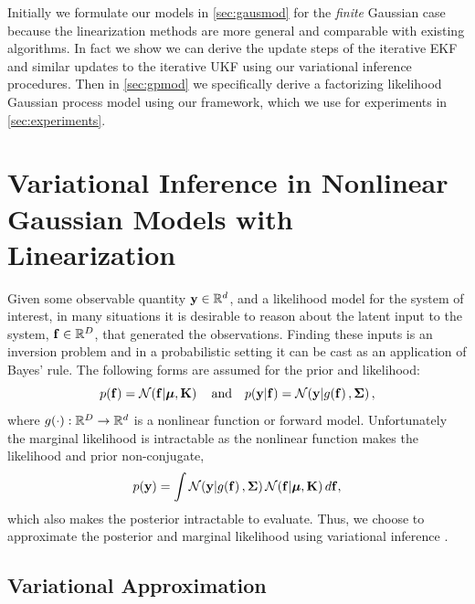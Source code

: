 \documentclass{article} %
\begin{document}
Initially we formulate our models in \autoref{sec:gausmod} for the
\emph{finite} Gaussian case because the linearization methods are more general
and comparable with existing algorithms. In fact we show we can derive the
update steps of the iterative EKF \cite{Bell1993} and similar updates to the
iterative UKF \cite{Sibley2006} using our variational inference procedures.
Then in \autoref{sec:gpmod} we specifically derive a factorizing likelihood
Gaussian process model using our framework, which we use for experiments in
\autoref{sec:experiments}.


\section{Variational Inference in Nonlinear Gaussian Models with Linearization}
\label{sec:gausmod}

Given some observable quantity $\mathbf{y} \in \mathbb{R}^{d}$, and a likelihood model for
the system of interest, in many situations it is desirable to reason about the
latent input to the system, $\mathbf{f}\in\mathbb{R}^{D}$, that generated the
observations. Finding these inputs is an inversion problem and in a
probabilistic setting it can be cast as an application of Bayes' rule.
The following forms are assumed for the prior and likelihood:
\begin{equation}
    p\!\left({\mathbf{f}}\right) = \mathcal{N}\!\left({\mathbf{f}}\middle\vert{\ensuremath{\boldsymbol{\mu}}, \ensuremath{\mathbf{K}}}\right)
    \quad \text{and} \quad
    p\!\left({\mathbf{y}}\middle\vert{\ensuremath{\mathbf{f}}}\right) = \mathcal{N}\!\left({\mathbf{y}}\middle\vert{\ensuremath{g\!\left({{\mathbf{f}}}\right)}, \ensuremath{\boldsymbol{\Sigma}}}\right),
    \label{eq:priorlike}
\end{equation}
where $g\!\left({{\cdot}}\right) : \mathbb{R}^{D} \to \mathbb{R}^{d}$ is a nonlinear function or
forward model. Unfortunately the marginal likelihood is intractable
as the nonlinear function makes the likelihood and prior non-conjugate,
\begin{equation}
    p\!\left({\mathbf{y}}\right) = \int \mathcal{N}\!\left({\mathbf{y}}\middle\vert{\ensuremath{g\!\left({{\mathbf{f}}}\right)}, \ensuremath{\boldsymbol{\Sigma}}}\right)
        \mathcal{N}\!\left({\mathbf{f}}\middle\vert{\ensuremath{\boldsymbol{\mu}}, \ensuremath{\mathbf{K}}}\right) d\mathbf{f},
    \label{eq:marglike}
\end{equation}
which also makes the posterior intractable to evaluate. Thus, we choose to
approximate the posterior and marginal likelihood using variational inference
\cite{Jordan1999}.


\subsection{Variational Approximation}
\end{document}
